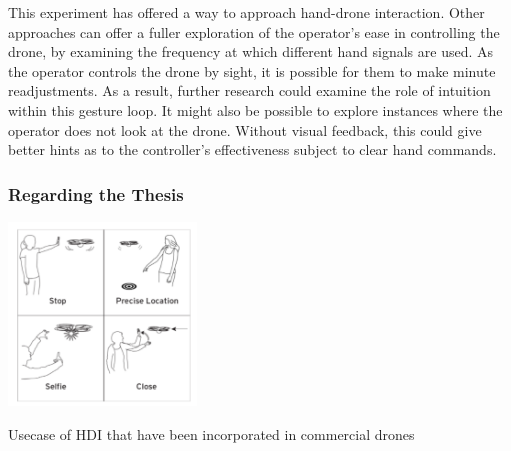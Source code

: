 This experiment has offered a way to approach hand-drone interaction. Other approaches can offer a fuller exploration of the operator's ease in controlling the drone, by examining the frequency at which different hand signals are used. As the operator controls the drone by sight, it is possible for them to make minute readjustments. As a result, further research could examine the role of intuition within this gesture loop. It might also be possible to explore instances where the operator does not look at the drone. Without visual feedback, this could give better hints as to the controller's effectiveness subject to clear hand commands.





\subsubsection{Regarding the Thesis}

\begin{marginfigure}%
  \includegraphics[width=5cm]{images/hdi_discussion/drone_and_me.PNG}
  \caption{Usecase of HDI that have been incorporated in commercial drones \cite{cauchard_e_zhai_landay_2015}}
  \label{fig:selfie}
\end{marginfigure}




